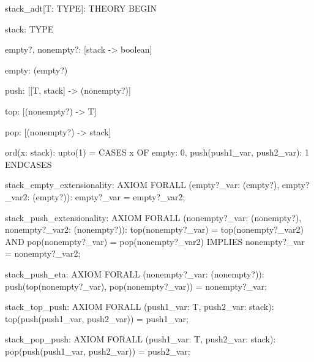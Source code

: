 
stack_adt[T: TYPE]: THEORY
 BEGIN

  stack: TYPE

  empty?, nonempty?: [stack -> boolean]

  empty: (empty?)

  push: [[T, stack] -> (nonempty?)]

  top: [(nonempty?) -> T]

  pop: [(nonempty?) -> stack]

  ord(x: stack): upto(1) =
      CASES x OF empty: 0, push(push1_var, push2_var): 1 ENDCASES

  stack_empty_extensionality: AXIOM
    FORALL (empty?_var: (empty?), empty?_var2: (empty?)):
      empty?_var = empty?_var2;

  stack_push_extensionality: AXIOM
    FORALL (nonempty?_var: (nonempty?), nonempty?_var2: (nonempty?)):
      top(nonempty?_var) = top(nonempty?_var2) AND
       pop(nonempty?_var) = pop(nonempty?_var2)
       IMPLIES nonempty?_var = nonempty?_var2;

  stack_push_eta: AXIOM
    FORALL (nonempty?_var: (nonempty?)):
      push(top(nonempty?_var), pop(nonempty?_var)) = nonempty?_var;

  stack_top_push: AXIOM
    FORALL (push1_var: T, push2_var: stack):
      top(push(push1_var, push2_var)) = push1_var;

  stack_pop_push: AXIOM
    FORALL (push1_var: T, push2_var: stack):
      pop(push(push1_var, push2_var)) = push2_var;
